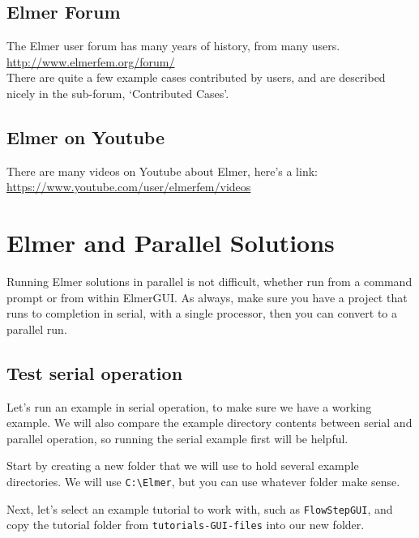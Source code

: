 \section{Elmer Forum}

The Elmer user forum has many years of history, from many users.\\

\url{http://www.elmerfem.org/forum/}\\

There are quite a few example cases contributed by users, and are described nicely in the sub-forum, `Contributed Cases'.

\section{Elmer on Youtube}

There are many videos on Youtube about Elmer, here's a link:\\

\url{https://www.youtube.com/user/elmerfem/videos}


\chapter{Elmer and Parallel Solutions}

Running Elmer solutions in parallel is not difficult, whether run from a command prompt or from within ElmerGUI.  As always, make sure you have a project that runs to completion in serial, with a single processor, then you can convert to a parallel run.

\section{Test serial operation}

Let's run an example in serial operation, to make sure we have a working example.  We will also compare the example directory contents between serial and parallel operation, so running the serial example first will be helpful.

Start by creating a new folder that we will use to hold several example directories.  We will use \texttt{C:\textbackslash{}Elmer}, but you can use whatever folder make sense.

Next, let's select an example tutorial to work with, such as \texttt{FlowStepGUI}, and copy the tutorial folder from \texttt{tutorials-GUI-files} into our new folder.

